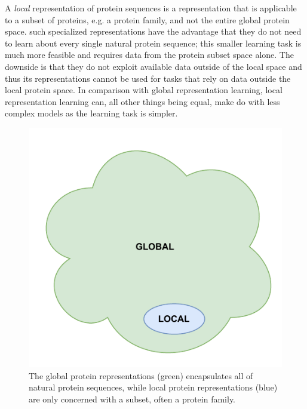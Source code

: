 A \textit{local} representation of protein sequences is a representation that is applicable to a subset of proteins, e.g. a protein family, and not the entire global protein space. such specialized representations have the advantage that they do not need to learn about every single natural protein sequence; this smaller learning task is much more feasible and requires data from the protein subset space alone. The downside is that they do not exploit available data outside of the local space and thus its representations cannot be used for tasks that rely on data outside the local protein space. In comparison with global representation learning, local representation learning can, all other things being equal, make do with less complex models as the learning task is simpler.
\begin{figure}[H]
    \centering
    \includegraphics{report/figures/global_local.pdf}
    \caption{The global protein representations (green) encapsulates all of natural protein sequences, while local protein representations (blue) are only concerned with a subset, often a protein family. }
    \label{fig:global_local}
\end{figure}

